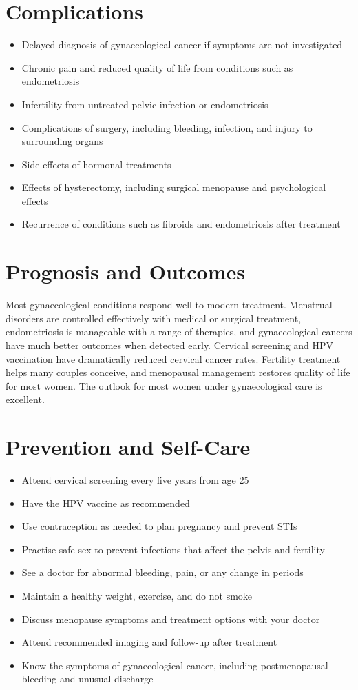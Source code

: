 \section*{Complications}
\begin{itemize}
    \item Delayed diagnosis of gynaecological cancer if symptoms are not investigated
    \item Chronic pain and reduced quality of life from conditions such as endometriosis
    \item Infertility from untreated pelvic infection or endometriosis
    \item Complications of surgery, including bleeding, infection, and injury to surrounding organs
    \item Side effects of hormonal treatments
    \item Effects of hysterectomy, including surgical menopause and psychological effects
    \item Recurrence of conditions such as fibroids and endometriosis after treatment
\end{itemize}

\section*{Prognosis and Outcomes}
Most gynaecological conditions respond well to modern treatment. Menstrual disorders are controlled effectively with medical or surgical treatment, endometriosis is manageable with a range of therapies, and gynaecological cancers have much better outcomes when detected early. Cervical screening and HPV vaccination have dramatically reduced cervical cancer rates. Fertility treatment helps many couples conceive, and menopausal management restores quality of life for most women. The outlook for most women under gynaecological care is excellent.

\section*{Prevention and Self-Care}
\begin{itemize}
    \item Attend cervical screening every five years from age 25
    \item Have the HPV vaccine as recommended
    \item Use contraception as needed to plan pregnancy and prevent STIs
    \item Practise safe sex to prevent infections that affect the pelvis and fertility
    \item See a doctor for abnormal bleeding, pain, or any change in periods
    \item Maintain a healthy weight, exercise, and do not smoke
    \item Discuss menopause symptoms and treatment options with your doctor
    \item Attend recommended imaging and follow-up after treatment
    \item Know the symptoms of gynaecological cancer, including postmenopausal bleeding and unusual discharge
\end{itemize}

